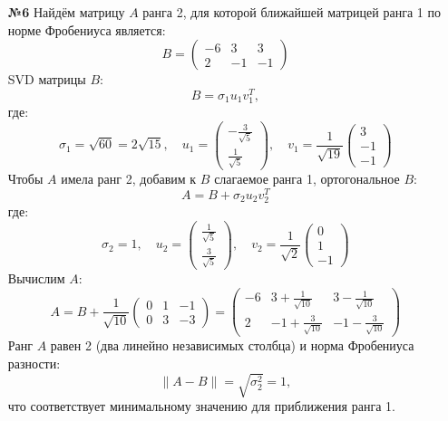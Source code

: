 \documentclass[a4paper]{article}
\begin{document}
\begin{enumerate}
  \item[\textbf{№6}]Найдём матрицу \( A \) ранга 2, для которой ближайшей матрицей ранга 1 по норме Фробениуса является:  
  \[
  B = \begin{pmatrix} -6 & 3 & 3 \\ 2 & -1 & -1 \end{pmatrix}
  \]
  SVD матрицы \( B \):
  \[
  B = \sigma_1 u_1 v_1^T,
  \]  
  где: 
  \[\sigma_1 = \sqrt{60} = 2\sqrt{15}, \quad
  u_1 = \begin{pmatrix} -\frac{3}{\sqrt{5}} \\ \frac{1}{\sqrt{5}} \end{pmatrix} ,
  \quad v_1 = \frac{1}{\sqrt{19}} \begin{pmatrix} 3 \\ -1 \\ -1 \end{pmatrix}\] 
  Чтобы \( A \) имела ранг 2, добавим к \( B \) слагаемое ранга 1, ортогональное \( B \):  
  \[
  A = B + \sigma_2 u_2 v_2^T
  \]  
  где:
  \[\sigma_2 = 1, \quad
   u_2 = \begin{pmatrix} \frac{1}{\sqrt{5}} \\ \frac{3}{\sqrt{5}} \end{pmatrix},
   \quad  v_2 = \frac{1}{\sqrt{2}} \begin{pmatrix} 0 \\ 1 \\ -1 \end{pmatrix}\]
  Вычислим \( A \):
  \[
  A = B + \frac{1}{\sqrt{10}} \begin{pmatrix} 0 & 1 & -1 \\ 0 & 3 & -3 \end{pmatrix} = \begin{pmatrix}
  -6 & 3 + \frac{1}{\sqrt{10}} & 3 - \frac{1}{\sqrt{10}} \\
  2 & -1 + \frac{3}{\sqrt{10}} & -1 - \frac{3}{\sqrt{10}}
  \end{pmatrix}
  \]
  Ранг \( A \) равен 2 (два линейно независимых столбца) и норма Фробениуса разности:  
  \[
  \|A - B\| = \sqrt{\sigma_2^2} = 1,
  \]  
  что соответствует минимальному значению для приближения ранга 1.
\end{enumerate}
\end{document}
